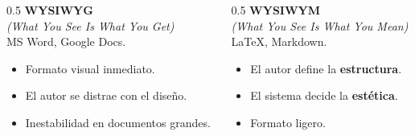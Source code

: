 \documentclass[12pt,aspectratio=169,ignorenonframetext]{ltxbeamer}
\begin{document}
\begin{frame}
\begin{columns}
    \begin{column}{0.5\textwidth}
        \begingroup
        \centering \textbf{WYSIWYG}\\
        \textit{(What You See Is What You Get)}\\
        MS Word, Google Docs.\\
        \endgroup
        \vspace{0.3em}
        \begin{itemize}
            \item Formato visual inmediato.
            \item El autor se distrae con el diseño.
            \item Inestabilidad en documentos grandes.
        \end{itemize}
    \end{column}

    \begin{column}{0.5\textwidth}
        \centering \textbf{WYSIWYM}\\
        \textit{(What You See Is What You Mean)}\\
        {\lmr\LaTeX}, Markdown.\\
        \vspace{0.3em}
        \begin{itemize}
            \item El autor define la \textbf{estructura}.
            \item El sistema decide la \textbf{estética}.
            \item Formato ligero.
        \end{itemize}
    \end{column}
\end{columns}
\end{frame}
\end{document}
